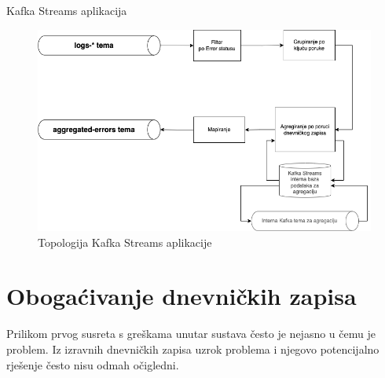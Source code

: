 \documentclass[times, utf8, diplomski]{fer}
\begin{document}
\begin{algorithm}
	\caption{Kafka Streams aplikacija}
	\label{algo:kstream}
	\begin{algorithmic}
		
		

		\ENDFOR
	\end{algorithmic}
\end{algorithm}

\begin{figure}[htb]
	\centering
	\includegraphics[width=15cm]{images/KStream.png}
	\caption[Topologija Kafka Streams aplikacije]{Topologija Kafka Streams aplikacije}
	\label{fig:kstream}
\end{figure}

\clearpage
\section{Obogaćivanje dnevničkih zapisa}
\label{sec:ai}

Prilikom prvog susreta s greškama unutar sustava često je nejasno u čemu je problem. Iz izravnih dnevničkih zapisa uzrok problema i njegovo potencijalno rješenje često nisu odmah očigledni.\\
\end{document}
